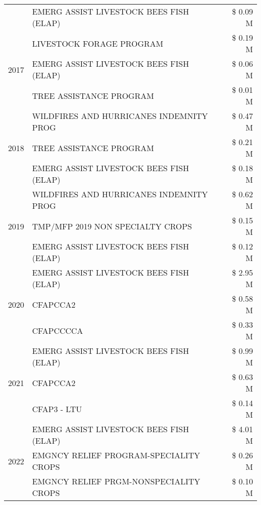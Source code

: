 \begin{tabular}{llr}
 & EMERG ASSIST LIVESTOCK BEES FISH (ELAP) & \$ 0.09 M \\
\cline{1-3}
\multirow[t]{3}{*}{2017} & LIVESTOCK FORAGE PROGRAM & \$ 0.19 M \\
 & EMERG ASSIST LIVESTOCK BEES FISH (ELAP) & \$ 0.06 M \\
 & TREE ASSISTANCE PROGRAM & \$ 0.01 M \\
\cline{1-3}
\multirow[t]{3}{*}{2018} & WILDFIRES AND HURRICANES INDEMNITY PROG & \$ 0.47 M \\
 & TREE ASSISTANCE PROGRAM & \$ 0.21 M \\
 & EMERG ASSIST LIVESTOCK BEES FISH (ELAP) & \$ 0.18 M \\
\cline{1-3}
\multirow[t]{3}{*}{2019} & WILDFIRES AND HURRICANES INDEMNITY PROG & \$ 0.62 M \\
 & TMP/MFP 2019 NON SPECIALTY CROPS & \$ 0.15 M \\
 & EMERG ASSIST LIVESTOCK BEES FISH (ELAP) & \$ 0.12 M \\
\cline{1-3}
\multirow[t]{3}{*}{2020} & EMERG ASSIST LIVESTOCK BEES FISH (ELAP) & \$ 2.95 M \\
 & CFAPCCA2 & \$ 0.58 M \\
 & CFAPCCCCA & \$ 0.33 M \\
\cline{1-3}
\multirow[t]{3}{*}{2021} & EMERG ASSIST LIVESTOCK BEES FISH (ELAP) & \$ 0.99 M \\
 & CFAPCCA2 & \$ 0.63 M \\
 & CFAP3 - LTU & \$ 0.14 M \\
\cline{1-3}
\multirow[t]{3}{*}{2022} & EMERG ASSIST LIVESTOCK BEES FISH (ELAP) & \$ 4.01 M \\
 & EMGNCY RELIEF PROGRAM-SPECIALITY CROPS & \$ 0.26 M \\
 & EMGNCY RELIEF PRGM-NONSPECIALITY CROPS & \$ 0.10 M \\
\cline{1-3}
\bottomrule
\end{tabular}
